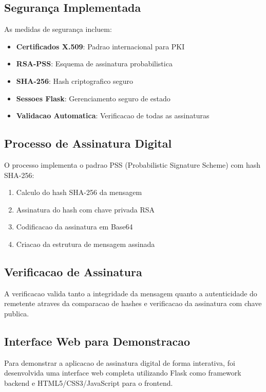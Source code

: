 \documentclass[12pt,a4paper,oneside]{article}
\begin{document}
\subsection{Segurança Implementada}

As medidas de segurança incluem:

\begin{itemize}
    \item \textbf{Certificados X.509}: Padrao internacional para PKI
    \item \textbf{RSA-PSS}: Esquema de assinatura probabilistica
    \item \textbf{SHA-256}: Hash criptografico seguro
    \item \textbf{Sessoes Flask}: Gerenciamento seguro de estado
    \item \textbf{Validacao Automatica}: Verificacao de todas as assinaturas
\end{itemize}

\subsection{Processo de Assinatura Digital}

O processo implementa o padrao PSS (Probabilistic Signature Scheme) com hash SHA-256:

\begin{enumerate}
    \item Calculo do hash SHA-256 da mensagem
    \item Assinatura do hash com chave privada RSA
    \item Codificacao da assinatura em Base64
    \item Criacao da estrutura de mensagem assinada
\end{enumerate}

\subsection{Verificacao de Assinatura}

A verificacao valida tanto a integridade da mensagem quanto a autenticidade do remetente atraves da comparacao de hashes e verificacao da assinatura com chave publica.

\subsection{Interface Web para Demonstracao}

Para demonstrar a aplicacao de assinatura digital de forma interativa, foi desenvolvida uma interface web completa utilizando Flask como framework backend e HTML5/CSS3/JavaScript para o frontend.
\end{document}
